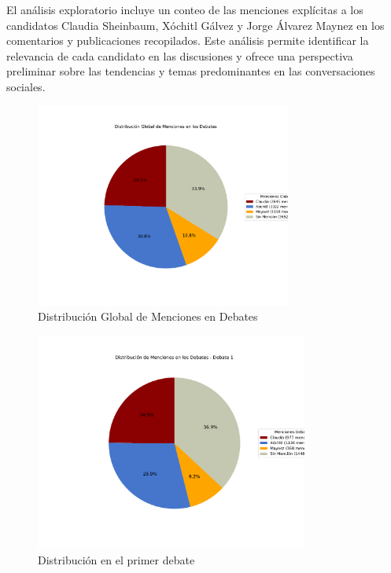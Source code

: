 \documentclass[10pt, a4paper]{article}
\begin{document}
	El análisis exploratorio incluye un conteo de las menciones explícitas a los candidatos Claudia Sheinbaum, Xóchitl Gálvez y Jorge Álvarez Maynez en los comentarios y publicaciones recopilados. Este análisis permite identificar la relevancia de cada candidato en las discusiones y ofrece una perspectiva preliminar sobre las tendencias y temas predominantes en las conversaciones sociales.
	
	\begin{figure}[h!]
		\centering
		\includegraphics[width=0.75\textwidth]{grafica_global_debates.pdf} %
		\vspace{-15mm}
		\caption{Distribución Global de Menciones en Debates}
		\label{fig:globalDebates} %
	\end{figure}
	
	
	\newpage
	\begin{figure}[h!]
		\centering
		\includegraphics[width=0.8\textwidth]{grafica_debate1.pdf} %
		\vspace{-15mm}
		\caption{Distribución en el primer debate}
		\label{fig:distrDebate1} %
	\end{figure}
	
\end{document}
